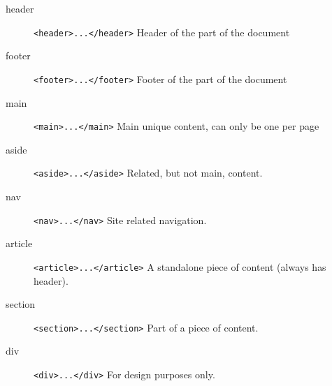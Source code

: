 \begin{description}
    \item[header] \texttt{<header>...</header>} Header of the part of the document
    \item[footer] \texttt{<footer>...</footer>} Footer of the part of the document
    \item[main] \texttt{<main>...</main>} Main unique content, can only be one per page
    \item[aside] \texttt{<aside>...</aside>} Related, but not main, content.
    \item[nav] \texttt{<nav>...</nav>} Site related navigation.
    \item[article] \texttt{<article>...</article>} A standalone piece of content (always has header).
    \item[section] \texttt{<section>...</section>} Part of a piece of content.
    \item[div] \texttt{<div>...</div>} For design purposes only.
\end{description}
